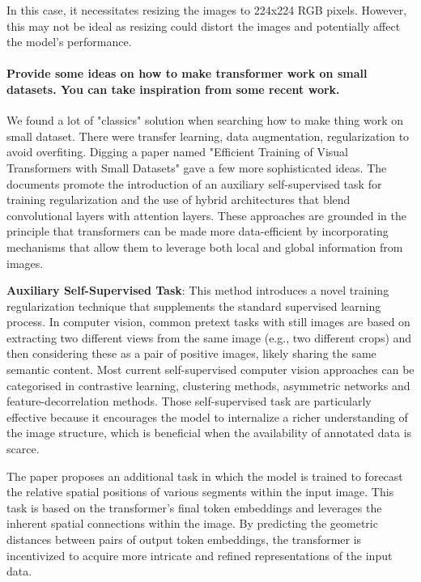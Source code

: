 In this case, it necessitates resizing the images to 224x224 RGB pixels. However, this may not be ideal as resizing could distort the images and potentially affect the model's performance.

\paragraph{Provide some ideas on how to make transformer work on small datasets. You can take inspiration from some recent work.}

We found a lot of "classics" solution when searching how to make thing work on small dataset. There were transfer learning, data augmentation, regularization to avoid overfiting. 
Digging a paper named "Efficient Training of Visual Transformers with Small Datasets" gave a few more sophisticated ideas. The documents promote the introduction of an auxiliary self-supervised task for training regularization and the use of hybrid architectures that blend convolutional layers with attention layers. These approaches are grounded in the principle that transformers can be made more data-efficient by incorporating mechanisms that allow them to leverage both local and global information from images.

\textbf{Auxiliary Self-Supervised Task}: This method introduces a novel training regularization technique that supplements the standard supervised learning process. In computer vision, common pretext tasks with still images are based on extracting two different views from the same image (e.g., two different crops) and then considering these as a pair of positive images, likely sharing the same semantic content. Most current self-supervised computer
vision approaches can be categorised in contrastive learning, clustering methods, asymmetric networks and feature-decorrelation methods. Those self-supervised task are particularly effective because it encourages the model to internalize a richer understanding of the image structure, which is beneficial when the availability of annotated data is scarce.

The paper proposes an additional task in which the model is trained to forecast the relative spatial positions of various segments within the input image. This task is based on the transformer's final token embeddings and leverages the inherent spatial connections within the image. By predicting the geometric distances between pairs of output token embeddings, the transformer is incentivized to acquire more intricate and refined representations of the input data.

